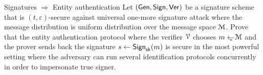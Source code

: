 \documentclass{crypto-exercise}
\author{Sven Laur}
\begin{document}
\begin{exercise}{Signatures $\Rightarrow$ Entity authentication}
Let $(\mathsf{Gen},\mathsf{Sign},\mathsf{Ver})$ be a signature scheme that is $(t,\varepsilon)$-secure against universal one-more signature attack where the message distribution is uniform distribution over the message space $\mathcal{M}$.  
Prove that the entity authentication protocol where the verifier $\mathcal{V}$ chooses $m\gets_{\scriptscriptstyle \hspace*{-0.65em} u\hspace*{0.0em}} \mathcal{M}$ and the prover sends back the signature $s\gets \mathsf{Sign}_{\mathsf{sk}}(m)$ is secure in the most powerful setting where the adversary can run several identification protocols concurrently in order to impersonate true signer.
\end{exercise}
\begin{solution}

\end{solution}
\end{document}
